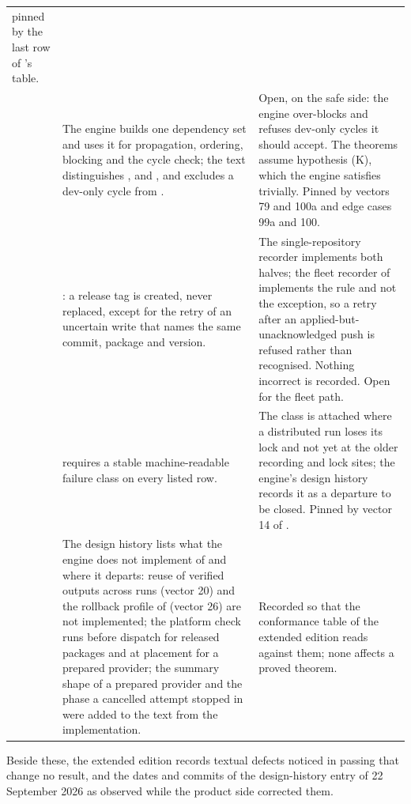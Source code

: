 \begin{center}
\begin{longtable}{@{}L{2.2cm}L{6.2cm}L{5.6cm}@{}}
pinned by the last row of 's table. \\
 & The engine builds one dependency set and uses it for
propagation, ordering, blocking and the cycle check; the text distinguishes
,  and
, and excludes a dev-only cycle from . &
Open, on the safe side: the engine over-blocks and refuses dev-only cycles it
should accept. The theorems assume hypothesis (K), which the engine satisfies
trivially. Pinned by vectors 79 and 100a and edge cases 99a and 100. \\
 & : a release tag is created, never replaced,
except for the retry of an uncertain write that names the same commit,
package and version. & The single-repository recorder implements both halves;
the fleet recorder of  implements the rule and not the exception, so
a retry after an applied-but-unacknowledged push is refused rather than
recognised. Nothing incorrect is recorded. Open for the fleet path. \\
 &  requires a stable machine-readable failure
class on every listed row. & The class is attached where a distributed run
loses its lock and not yet at the older recording and lock sites; the engine's
design history records it as a departure to be closed. Pinned by vector 14 of
. \\
 & The design history lists what the engine does not
implement of  and where it departs: reuse of verified outputs across
runs (vector 20) and the rollback profile of  (vector 26) are not
implemented; the platform check runs before dispatch for released packages
and at placement for a prepared provider; the summary shape of a prepared
provider and the phase a cancelled attempt stopped in were added to the text
from the implementation. & Recorded so that the conformance table of the
extended edition reads against them; none affects a proved theorem. \\
\bottomrule
\end{longtable}
\end{center}

Beside these, the extended edition records textual defects noticed in passing
that change no result, and the dates and commits of the design-history entry
of 22 September 2026 as observed while the product side corrected them.
